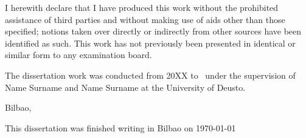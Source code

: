 



\ifpdf
    \graphicspath{{9_backmatter/figures/PNG/}{9_backmatter/figures/PDF/}{9_backmatter/figures/}}
\else
    \graphicspath{{9_backmatter/figures/EPS/}{9_backmatter/figures/}}
\fi



\begin{declaration}        %

I herewith declare that I have produced this work without the prohibited assistance of third parties and without making use of aids other than those specified; notions taken over directly or indirectly from other sources have been identified as such. This work has not previously been presented in identical or similar form to any examination board.

The dissertation work was conducted from 20XX to \the\year \ under the supervision of
Name Surname
and 
Name Surname
at 
the University of Deusto.

\vspace{10mm}

Bilbao,




\end{declaration}




\thispagestyle{empty}

\hfill
\vfill
\medskip

\begin{center}
\noindent
This dissertation was finished writing 
in 
Bilbao
on
\today 
\end{center}

